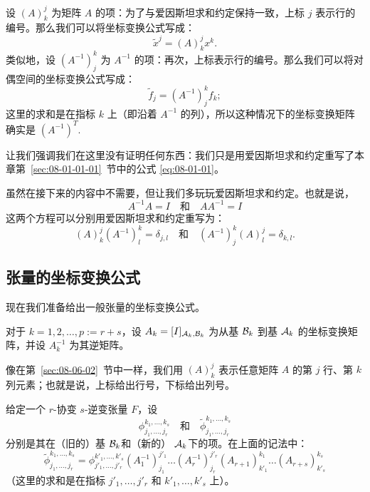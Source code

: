 设 $(A)^j_k$ 为矩阵 $A$ 的项：为了与爱因斯坦求和约定保持一致，上标 $j$ 表示行的编号。那么我们可以将坐标变换公式写成：
\begin{equation}\label{eq:08-06-03}
\widetilde{x}^j = (A)^j_k x^k.
\end{equation}
类似地，设 $(A^{-1})^k_j$ 为 $A^{-1}$ 的项：再次，上标表示行的编号。那么我们可以将对偶空间的坐标变换公式写成：
\begin{equation}\label{eq:08-06-04}
\widetilde{f}_j = (A^{-1})^k_j f_k;
\end{equation}
这里的求和是在指标 $k$ 上（即沿着 $A^{-1}$ 的列），所以这种情况下的坐标变换矩阵确实是 $(A^{-1})^T$.~

让我们强调我们在这里没有证明任何东西：我们只是用爱因斯坦求和约定重写了本章第~\ref{sec:08-01-01-01}~节中的公式 \eqref{eq:08-01-01}。

\begin{remark*}
虽然在接下来的内容中不需要，但让我们多玩玩爱因斯坦求和约定。也就是说，$$A^{-1}A = I \quad \text{和}\quad AA^{-1} = I$$
这两个方程可以分别用爱因斯坦求和约定重写为：
$$ (A)^j_k (A^{-1})^k_l = \delta_{j,l}\quad
\text{和}
\quad (A^{-1})^k_j (A)^j_l = \delta_{k,l}. $$
\end{remark*}


\subsection{张量的坐标变换公式}\label{sec:08-06-03}


现在我们准备给出一般张量的坐标变换公式。

对于 $k = 1, 2, \dots, p := r+s$，设 $A_k = [I]_{\mathcal{A}_k,\mathcal{B}_k}$ 为从基 $\mathcal{B}_k$ 到基 $\mathcal{A}_k$ 的坐标变换矩阵，并设 $A^{-1}_k$ 为其逆矩阵。

像在第~\ref{sec:08-06-02}~节中一样，我们用 $(A)^j_k$ 表示任意矩阵 $A$ 的第 $j$ 行、第 $k$ 列元素；也就是说，上标给出行号，下标给出列号。

\begin{proposition}\label{stmt:08-06-02}
给定一个 $r$-协变 $s$-逆变张量 $F$，设
$$\phi^{k_1, \dots, k_s}_{j_1, \dots, j_r}\quad \text{和} \quad \widetilde{\phi}^{k_1, \dots, k_s}_{j_1, \dots, j_r}$$
分别是其在（旧的）基 $\mathcal{B}_k$和（新的） $\mathcal{A}_k$下的项。在上面的记法中：
$$ \widetilde{\phi}^{k_1, \dots, k_s}_{j_1, \dots, j_r} = \phi^{k'_1, \dots, k'_s}_{j'_1, \dots, j'_r} (A^{-1}_1)^{j'_1}_{j_1} \dots (A^{-1}_r)^{j'_r}_{j_r} (A_{r+1})^{k_1}_{k'_1} \dots (A_{r+s})^{k_s}_{k'_s} $$
（这里的求和是在指标 $j'_1, \dots, j'_r$ 和 $k'_1, \dots, k'_s$ 上）。
\end{proposition}

